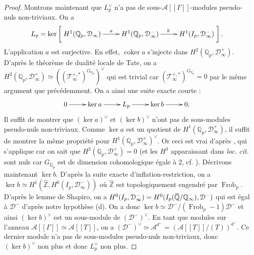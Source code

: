 \documentclass[12pt]{amsart}
\newcommand\bZ{\mathbb{Z}}
\newcommand\bQ{\mathbb{Q}}
\newcommand\Qp{\mathbb{Q}_{p}}
\newcommand\cA{\mathcal{A}}
\newcommand\cD{\mathcal{D}}
\newcommand\cT{\mathcal{T}}
\newcommand{\ob}[1]{\mkern 1.5mu\overline{\mkern-1.5mu#1\mkern-1.5mu}\mkern 1.5mu}
\DeclareMathOperator{\coker}{coker}
\DeclareMathOperator{\Frob}{Frob}
\theoremstyle{defstyle}
\theoremstyle{thmstyle}
\begin{document}
\begin{proof}
	Montrons maintenant que $L_p^\vee$ n'a pas de sous-$\cA[[\Gamma]]$-modules pseudo-nuls non-triviaux. On a 
	$$L_p=\ker\left[ \xymatrix{H^1(\bQ_p,\cD_\infty) \ar[r]^a & H^1(\bQ_p,\cD_\infty^-) \ar[r]^b & H^1(I_p,\cD_\infty^-)}\right].$$
	L'application $a$ est surjective. En effet, $\coker a$ s'injecte dans $H^2(\bQ_p,\cD_\infty^+)$. D'après le théorème de dualité locale de Tate, on a $H^2(\bQ_p,\cD_\infty^+) \simeq \left( (\cT_\infty^{+,*})^{G_{\Qp}}\right)^\vee$ qui est trivial car $(\cT_\infty^{+,*})^{G_{\Qp}}=0$ par le même argument que précédemment. On a ainsi une suite exacte courte :
	$$\xymatrix{ 0 \ar[r] &  \ker a \ar[r] & L_p \ar[r] & \ker b \ar[r] & 0. }$$
	Il suffit de montrer que $(\ker a)^\vee$ et $(\ker b)^\vee$ n'ont pas de sous-modules pseudo-nuls non-triviaux. Comme $\ker a$ est un quotient de $H^1(\Qp,\cD_\infty^+)$, il suffit de montrer la même propriété pour $H^1(\Qp,\cD_\infty^+)^\vee$. Or ceci est vrai d'après \cite[Proposition 3.7]{greenberg2006structure}, qui s'applique car on sait que $H^2(\bQ_p,\cD_\infty^+)=0$ (et les $H^3$ apparaissant dans \textit{loc. cit.} sont nuls car $G_{\Qp}$ est de dimension cohomologique égale à 2, cf. \cite[§5.1.b)]{serrecohomologie}). Décrivons maintenant $\ker b$. D'après la suite exacte d'inflation-restriction, on a $\ker b \simeq H^1(\hat{\bZ},H^0(I_p,\cD_\infty^-))$ où $\hat{\bZ}$ est topologiquement engendré par $\Frob_p$. D'après le lemme de Shapiro, on a $H^0(I_p,\cD_\infty^-) = H^0(I_p(\ob{\bQ}/\bQ_\infty),\cD^-)$ qui est égal à $\cD^-$ d'après notre hypothèse (d). On a donc $\ker b \simeq \cD^-/(\Frob_p-1)\cD^-$ et ainsi $(\ker b)^\vee$ est un sous-module de $(\cD^-)^\vee$. En tant que modules sur l'anneau $\cA[[\Gamma]] \simeq \cA[[T]]$, on a $(\cD^-)^\vee \simeq {\cA}^{d^-} =  (\cA[[T]]/(T))^{d^-}$. Ce dernier module n'a pas de sous-modules pseudo-nuls non-triviaux, donc $(\ker b)^\vee$ non plus et donc $L_p^\vee$ non plus.
	

\end{proof}
\end{document}
